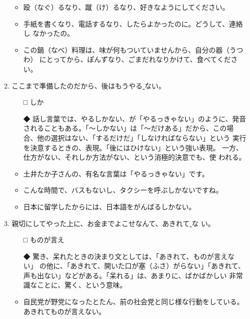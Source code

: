 \documentclass[
uplatex,
b5paper,
10pt,
dvipdfmx
]{jsbook}
\begin{document}
\begin{enumerate}
\begin{itemize}
\item 殴（なぐ）るなり、蹴（け）るなり、好きなようにしてください。
\item 手紙を書くなり、電話するなり、したらよかったのに。どうして、連絡し
      なかったの。
\item この鍋（なべ）料理は、味が何もついていませんから、自分の器（うつわ）
      にとってから、ぽんずなり、ごまだれなりかけて、食べてください。
\end{itemize}

\item ここまで準備したのだから、後はもうやる\underline{    }ない。
\begin{itemize}
\item[□] しか
\item[◆] 話し言葉では、やるしかない、が「やるっきゃない」のように、発音
	  されることもある。「〜しかない」は「〜だけある」だから、この場
	  合、他の選択はない、「するだけだ」「しなければならない」という
	  実行を決意するときの、表現。「後にはひけない」という強い表現。
	  一方、仕方がない、それしか方法がない、という消極的決意でも、使
	  われる。
\end{itemize}
\begin{itemize}
\item 土井たか子さんの、有名な言葉は「やるっきゃない」です。
\item こんな時間で、バスもないし、タクシーを呼ぶしかないですね。
\item 日本に留学したからには、日本語をがんばるしかない。 
\end{itemize}


\item 親切にしてやった上に、お金までよこせなんて、あきれて\underline{    }な
      い。
\begin{itemize}
\item[□] ものが言え
\item[◆] 驚き、呆れたときの決まり文としては、「あきれて、ものが言えない」
	  の他に、「あきれて、開いた口が塞（ふさ）がらない」「あきれて、
	  声も出ない」などがある。「呆れる」は、あまりに、ばかばかしい
	  非常識なことに、驚く、という意味。
\end{itemize}
\begin{itemize}
 \item 自民党が野党になったとたん、前の社会党と同じ様な行動をしている。
       あきれてものが言えない。
\end{itemize}


\end{enumerate}
\end{document}
